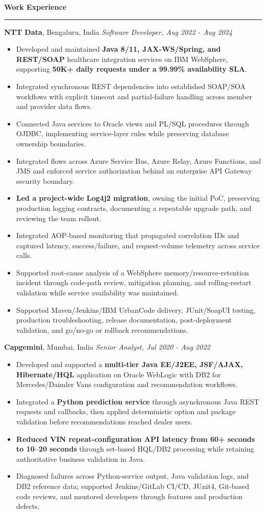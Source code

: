 \documentclass[11pt,letterpaper]{article}
\newcommand{\ressection}[1]{\Needspace{6\baselineskip}\vspace{8pt}\par\textbf{#1}\par\vspace{2pt}\hrule\vspace{5pt}}
\begin{document}
\ressection{Work Experience}
\textbf{NTT Data}, Bengaluru, India \hfill \textit{Software Developer, Aug 2022 - Aug 2024}
\begin{itemize}
  \item Developed and maintained \textbf{Java 8/11, JAX-WS/Spring, and REST/SOAP} healthcare integration services on IBM WebSphere, supporting \textbf{50K+ daily requests under a 99.99\% availability SLA}.
  \item Integrated synchronous REST dependencies into established SOAP/SOA workflows with explicit timeout and partial-failure handling across member and provider data flows.
  \item Connected Java services to Oracle views and PL/SQL procedures through OJDBC, implementing service-layer rules while preserving database ownership boundaries.
  \item Integrated flows across Azure Service Bus, Azure Relay, Azure Functions, and JMS and enforced service authorization behind an enterprise API Gateway security boundary.
  \item \textbf{Led a project-wide Log4j2 migration}, owning the initial PoC, preserving production logging contracts, documenting a repeatable upgrade path, and reviewing the team rollout.
  \item Integrated AOP-based monitoring that propagated correlation IDs and captured latency, success/failure, and request-volume telemetry across service calls.
  \item Supported root-cause analysis of a WebSphere memory/resource-retention incident through code-path review, mitigation planning, and rolling-restart validation while service availability was maintained.
  \item Supported Maven/Jenkins/IBM UrbanCode delivery, JUnit/SoapUI testing, production troubleshooting, release documentation, post-deployment validation, and go/no-go or rollback recommendations.
\end{itemize}
\textbf{Capgemini}, Mumbai, India \hfill \textit{Senior Analyst, Jul 2020 - Aug 2022}
\begin{itemize}
  \item Developed and supported a \textbf{multi-tier Java EE/J2EE, JSF/AJAX, Hibernate/HQL} application on Oracle WebLogic with DB2 for Mercedes/Daimler Vans configuration and recommendation workflows.
  \item Integrated a \textbf{Python prediction service} through asynchronous Java REST requests and callbacks, then applied deterministic option and package validation before recommendations reached dealer users.
  \item \textbf{Reduced VIN repeat-configuration API latency from 60+ seconds to 10--20 seconds} through set-based HQL/DB2 processing while retaining authoritative business validation in Java.
  \item Diagnosed failures across Python-service output, Java validation logs, and DB2 reference data; supported Jenkins/GitLab CI/CD, JUnit4, Git-based code reviews, and mentored developers through features and production defects.
\end{itemize}
\end{document}
